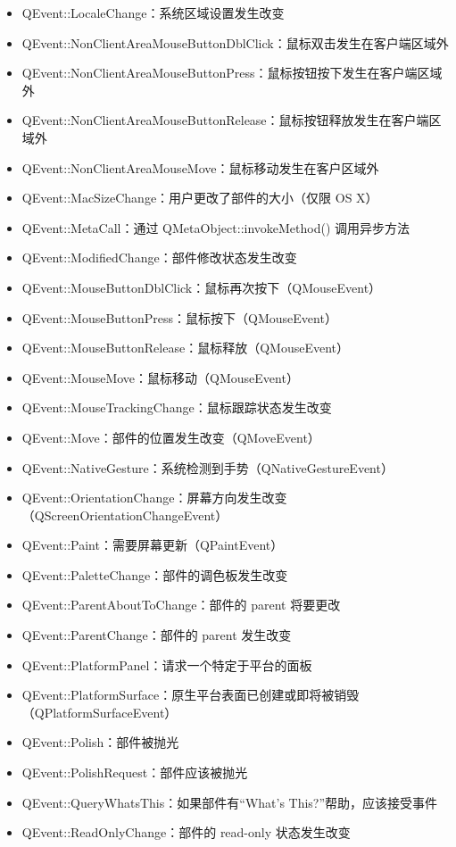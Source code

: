 \begin{itemize}
\item{QEvent::LocaleChange：系统区域设置发生改变}
\item{QEvent::NonClientAreaMouseButtonDblClick：鼠标双击发生在客户端区域外}
\item{QEvent::NonClientAreaMouseButtonPress：鼠标按钮按下发生在客户端区域外}
\item{QEvent::NonClientAreaMouseButtonRelease：鼠标按钮释放发生在客户端区域外}
\item{QEvent::NonClientAreaMouseMove：鼠标移动发生在客户区域外}
\item{QEvent::MacSizeChange：用户更改了部件的大小（仅限 OS X）}
\item{QEvent::MetaCall：通过 QMetaObject::invokeMethod() 调用异步方法}
\item{QEvent::ModifiedChange：部件修改状态发生改变}
\item{QEvent::MouseButtonDblClick：鼠标再次按下（QMouseEvent）}
\item{QEvent::MouseButtonPress：鼠标按下（QMouseEvent）}
\item{QEvent::MouseButtonRelease：鼠标释放（QMouseEvent）}
\item{QEvent::MouseMove：鼠标移动（QMouseEvent）}
\item{QEvent::MouseTrackingChange：鼠标跟踪状态发生改变}
\item{QEvent::Move：部件的位置发生改变（QMoveEvent）}
\item{QEvent::NativeGesture：系统检测到手势（QNativeGestureEvent）}
\item{QEvent::OrientationChange：屏幕方向发生改变（QScreenOrientationChangeEvent）}
\item{QEvent::Paint：需要屏幕更新（QPaintEvent）}
\item{QEvent::PaletteChange：部件的调色板发生改变}
\item{QEvent::ParentAboutToChange：部件的 parent 将要更改}
\item{QEvent::ParentChange：部件的 parent 发生改变}
\item{QEvent::PlatformPanel：请求一个特定于平台的面板}
\item{QEvent::PlatformSurface：原生平台表面已创建或即将被销毁（QPlatformSurfaceEvent）}
\item{QEvent::Polish：部件被抛光}
\item{QEvent::PolishRequest：部件应该被抛光}
\item{QEvent::QueryWhatsThis：如果部件有“What’s This?”帮助，应该接受事件}
\item{QEvent::ReadOnlyChange：部件的 read-only 状态发生改变}

\end{itemize}
